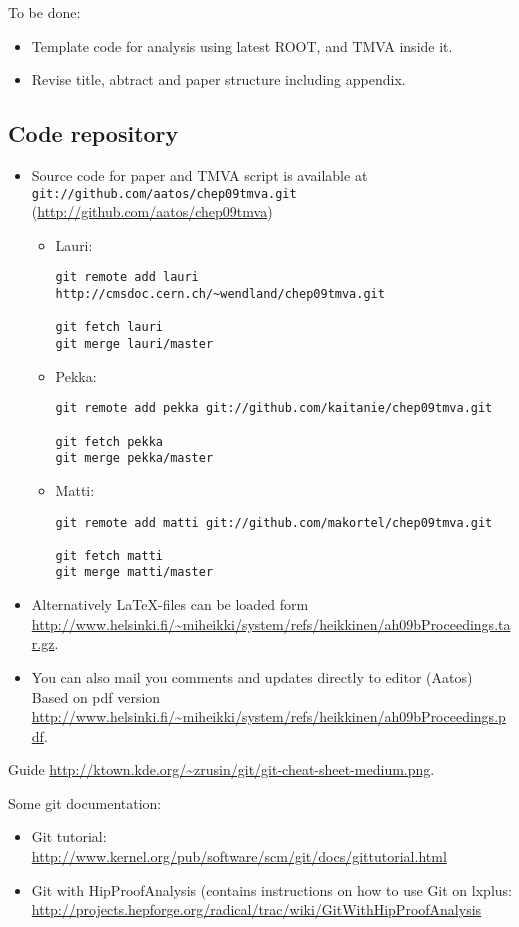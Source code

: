 \begin{appendix}
To be done:
\begin{itemize}
\item Template code for  analysis using latest ROOT, and TMVA inside it.
\item Revise title, abtract and paper structure including appendix.
\end{itemize}

\subsection{Code repository}
\begin{itemize}
\item Source code for paper and TMVA script  is available at 
{\tt git://github.com/aatos/chep09tmva.git} (\url{http://github.com/aatos/chep09tmva})

\begin{itemize}
\item Lauri:
\begin{verbatim}
git remote add lauri http://cmsdoc.cern.ch/~wendland/chep09tmva.git

git fetch lauri
git merge lauri/master
\end{verbatim}
\item Pekka:
\begin{verbatim}
git remote add pekka git://github.com/kaitanie/chep09tmva.git

git fetch pekka
git merge pekka/master
\end{verbatim}
\item Matti:
\begin{verbatim}
git remote add matti git://github.com/makortel/chep09tmva.git

git fetch matti
git merge matti/master
\end{verbatim}
\end{itemize}

\item Alternatively LaTeX-files can be loaded form
\url{http://www.helsinki.fi/~miheikki/system/refs/heikkinen/ah09bProceedings.tar.gz}.
\item You can also mail you comments and updates directly to editor (Aatos)
Based on pdf version
\url{http://www.helsinki.fi/~miheikki/system/refs/heikkinen/ah09bProceedings.pdf}.
\end{itemize}

Guide \url{http://ktown.kde.org/~zrusin/git/git-cheat-sheet-medium.png}.

Some git documentation:
\begin{itemize}
\item Git tutorial: \url{http://www.kernel.org/pub/software/scm/git/docs/gittutorial.html}
\item Git with HipProofAnalysis (contains instructions on how to use
  Git on lxplus:
  \url{http://projects.hepforge.org/radical/trac/wiki/GitWithHipProofAnalysis}
\end{itemize}


\end{appendix}

